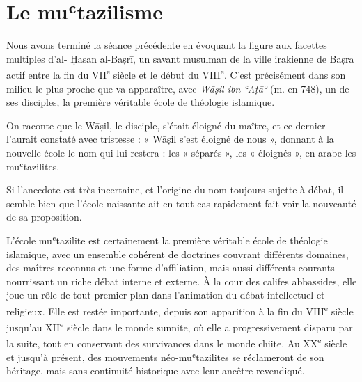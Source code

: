  
 
\chapter{Le muʿtazilisme} 


Nous avons terminé la séance précédente en évoquant la figure aux
facettes multiples d'al- Ḥasan al-Baṣrī, un savant musulman de la ville
irakienne de Baṣra actif entre la fin du VII\textsuperscript{e} siècle
et le début du VIII\textsuperscript{e}. C'est précisément dans son
milieu le plus proche que va apparaître, avec \emph{Wāṣil ibn ʿAṭāʾ} (m. en
748), un de ses disciples, la première véritable école de théologie
islamique. 
\begin{Def}
On raconte que le Wāṣil, le disciple, s'était éloigné du
maître, et ce dernier l'aurait constaté avec tristesse : « Wāṣil s'est
éloigné de nous », donnant à la nouvelle école le nom qui lui restera :
les « séparés », les « éloignés », en arabe les muʿtazilites. 
\end{Def}
Si
l'anecdote est très incertaine, et l'origine du nom toujours sujette à
débat, il semble bien que l'école naissante ait en tout cas rapidement
fait voir la nouveauté de sa proposition.

L'école muʿtazilite est certainement la première véritable école de
théologie islamique, avec un ensemble cohérent de doctrines couvrant
différents domaines, des maîtres reconnus et une forme d'affiliation,
mais aussi différents courants nourrissant un riche débat interne et
externe. À la cour des califes abbassides, elle joue un rôle de tout
premier plan dans l'animation du débat intellectuel et religieux. Elle
est restée importante, depuis son apparition à la fin du
VIII\textsuperscript{e} siècle jusqu'au XII\textsuperscript{e} siècle
dans le monde sunnite, où elle a progressivement disparu par la suite,
tout en conservant des survivances dans le monde chiite. Au XX\textsuperscript{e} siècle et jusqu'à présent, des
mouvements néo-muʿtazilites se réclameront de
son héritage, mais sans continuité historique avec leur ancêtre
revendiqué.

